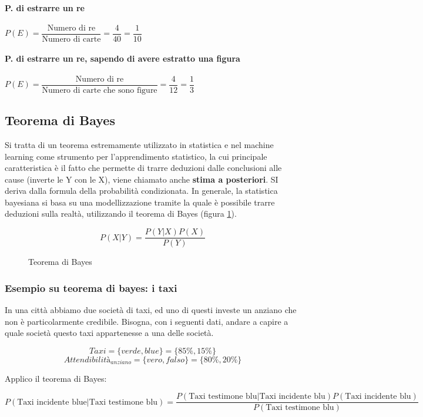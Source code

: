 \documentclass[\main/main.tex]{subfiles}
\begin{document}
\paragraph{P. di estrarre un re} $P(E) = \dfrac{\text{Numero di re}}{\text{Numero di carte}} = \dfrac{4}{40} = \dfrac{1}{10}$
\paragraph{P. di estrarre un re, sapendo di avere estratto una figura} $P(E) = \dfrac{\text{Numero di re}}{\text{Numero di carte che sono figure}} = \dfrac{4}{12} = \dfrac{1}{3}$

\subsection{Teorema di Bayes}
Si tratta di un teorema estremamente utilizzato in statistica e nel machine learning come strumento per l'apprendimento statistico, la cui principale caratteristica è il fatto che permette di trarre deduzioni dalle conclusioni alle cause (inverte le Y con le X), viene chiamato anche \textbf{stima a posteriori}. SI deriva dalla formula della probabilità condizionata. In generale, la statistica bayesiana si basa su una modellizzazione tramite la quale è possibile trarre deduzioni sulla realtà, utilizzando il teorema di Bayes (figura \ref{teorBayes}).

\begin{figure}[H]
  \[
    P(X|Y) = \dfrac{P(Y|X)P(X)}{P(Y)}
  \]
  \caption{Teorema di Bayes}
  \label{teorBayes}
\end{figure}

\subsubsection{Esempio su teorema di bayes: i taxi}
In una città abbiamo due società di taxi, ed uno di questi investe un anziano che non è particolarmente credibile. Bisogna, con i seguenti dati, andare a capire a quale società questo taxi appartenesse a una delle società.

\[
  Taxi = \{ verde, blue \} = \{85\%, 15\%\}
\]
\[
  Attendibilità_{anziano} = \{vero, falso\} = \{80 \%, 20\% \}
\]

Applico il teorema di Bayes:

\[
  P(\text{Taxi incidente blue} | \text{Taxi testimone blu}) = \dfrac{P(\text{Taxi testimone blu}| \text{Taxi incidente blu})P(\text{Taxi incidente blu})}{P(\text{Taxi testimone blu})}
\]
\end{document}
